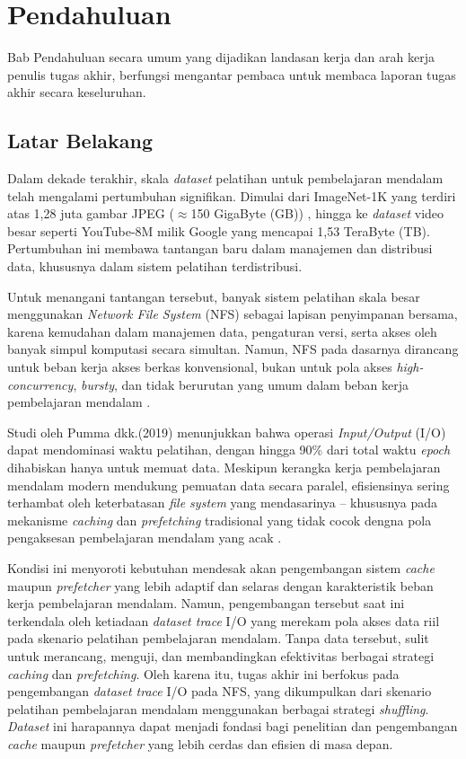 \chapter{Pendahuluan}

Bab Pendahuluan secara umum yang dijadikan landasan kerja dan arah kerja penulis tugas akhir, berfungsi mengantar pembaca untuk membaca laporan tugas akhir secara keseluruhan.

\section{Latar Belakang}
\label{sec:latarbelakang}

Dalam dekade terakhir, skala \textit{dataset} pelatihan untuk pembelajaran mendalam telah mengalami pertumbuhan signifikan. Dimulai dari ImageNet-1K yang terdiri atas 1,28 juta gambar JPEG ($\approx$150 GigaByte (GB)) \parencite{AcceleratingDL}, hingga ke \textit{dataset} video besar seperti YouTube-8M milik Google yang mencapai 1,53 TeraByte (TB). Pertumbuhan ini membawa tantangan baru dalam manajemen dan distribusi data, khususnya dalam sistem pelatihan terdistribusi.

Untuk menangani tantangan tersebut, banyak sistem pelatihan skala besar menggunakan \textit{Network File System} (NFS) sebagai lapisan penyimpanan bersama, karena kemudahan dalam manajemen data, pengaturan versi, serta akses oleh banyak simpul komputasi secara simultan. Namun, NFS pada dasarnya dirancang untuk beban kerja akses berkas konvensional, bukan untuk pola akses \textit{high-concurrency}, \textit{bursty}, dan tidak berurutan yang umum dalam beban kerja pembelajaran mendalam \parencite{360survey}.

Studi oleh Pumma dkk.(2019) menunjukkan bahwa operasi \textit{Input/Output} (I/O) dapat mendominasi waktu pelatihan, dengan hingga 90\% dari total waktu \textit{epoch} dihabiskan hanya untuk memuat data. Meskipun kerangka kerja pembelajaran mendalam modern mendukung pemuatan data secara paralel, efisiensinya sering terhambat oleh keterbatasan \textit{file system} yang mendasarinya -- khususnya pada mekanisme \textit{caching} dan \textit{prefetching} tradisional yang tidak cocok dengna pola pengaksesan pembelajaran mendalam yang acak \parencite{BundleShuffle}.

Kondisi ini menyoroti kebutuhan mendesak akan pengembangan sistem \textit{cache} maupun \textit{prefetcher} yang lebih adaptif dan selaras dengan karakteristik beban kerja pembelajaran mendalam. Namun, pengembangan tersebut saat ini terkendala oleh ketiadaan \textit{dataset trace} I/O yang merekam pola akses data riil pada skenario pelatihan pembelajaran mendalam. Tanpa data tersebut, sulit untuk merancang, menguji, dan membandingkan efektivitas berbagai strategi \textit{caching} dan \textit{prefetching}. Oleh karena itu, tugas akhir ini berfokus pada pengembangan \textit{dataset trace} I/O pada NFS, yang dikumpulkan dari skenario pelatihan pembelajaran mendalam menggunakan berbagai strategi \textit{shuffling}. \textit{Dataset} ini harapannya dapat menjadi fondasi bagi penelitian dan pengembangan \textit{cache} maupun \textit{prefetcher} yang lebih cerdas dan efisien di masa depan.

